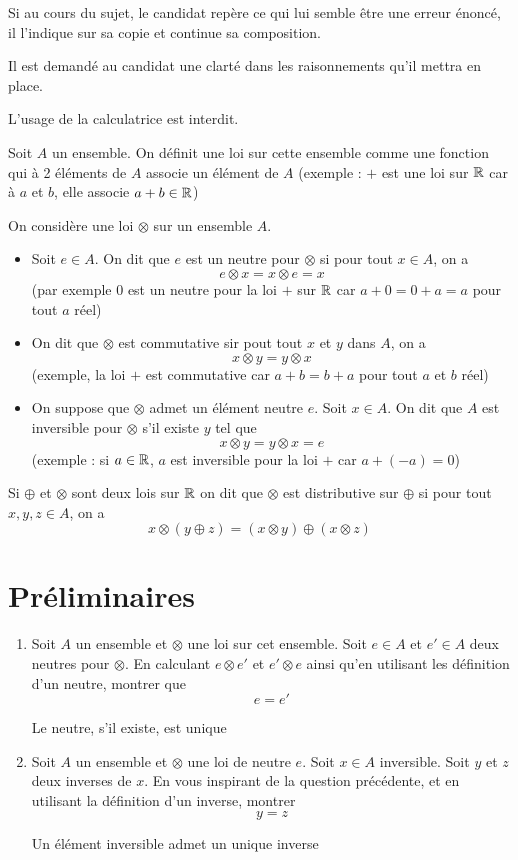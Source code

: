 


\newcommand{\covec}[2]{\begin{pmatrix}#1 \\#2 \end{pmatrix}}


\flushleft
Si au cours du sujet, le candidat repère ce qui lui semble être une erreur énoncé, il l'indique sur sa copie et continue sa composition. \newline

Il est demandé au candidat une clarté dans les raisonnements qu'il mettra en place. \newline

L'usage de la calculatrice est interdit.\newline

Soit $A$ un ensemble. On définit une loi sur cette ensemble comme une fonction qui à 2 éléments de $A$ associe un élément de $A$ (exemple : $+$ est une loi sur $\mathbb{R}$ car à $a$ et $b$, elle associe $a+b\in\mathbb{R}$)\newline

On considère une loi $\otimes$ sur un ensemble $A$. 
\begin{itemize}
\item Soit $e\in A$. On dit que $e$ est un neutre pour $\otimes$ si pour tout $x\in A$, on a
$$e\otimes x = x \otimes e = x$$
(par exemple 0 est un neutre pour la loi $+$ sur $\mathbb{R}$ car $a+ 0 = 0+a = a$ pour tout $a$ réel)
\item On dit que $\otimes$ est commutative sir pout tout $x$ et $y$ dans $A$, on a 
$$x\otimes y = y\otimes x$$
(exemple, la loi $+$ est commutative car $a+b=b+a$ pour tout $a$ et $b$ réel)
\item On suppose que $\otimes$ admet un élément neutre $e$. Soit $x\in A$. On dit que $A$ est inversible pour $\otimes$ s'il existe $y$ tel que 
$$x\otimes y = y \otimes x = e$$
(exemple : si $a\in \mathbb{R}$, $a$ est inversible pour la loi $+$ car $a+ (-a) = 0$)
\end{itemize}
Si $\oplus$ et $\otimes$ sont deux lois sur $\mathbb{R}$ on dit que $\otimes$ est distributive sur $\oplus$ si pour tout $x,y,z\in A$, on a 
$$x\otimes(y\oplus z) = (x\otimes y) \oplus (x\otimes z)$$
\section{Préliminaires}
\begin{enumerate}
\item Soit $A$ un ensemble et $\otimes$ une loi sur cet ensemble. Soit $e\in A$ et $e' \in A$ deux neutres pour $\otimes$. En calculant $e\otimes e'$ et $e' \otimes e$ ainsi qu'en utilisant les définition d'un neutre, montrer que $$e = e'$$

Le neutre, s'il existe, est unique
\item Soit $A$ un ensemble et $\otimes$ une loi de neutre $e$. Soit $x\in A$ inversible. Soit $y$ et $z$ deux inverses de $x$. En vous inspirant de la question précédente, et en utilisant la définition d'un inverse, montrer $$y = z$$

Un élément inversible admet un unique inverse
\end{enumerate}
